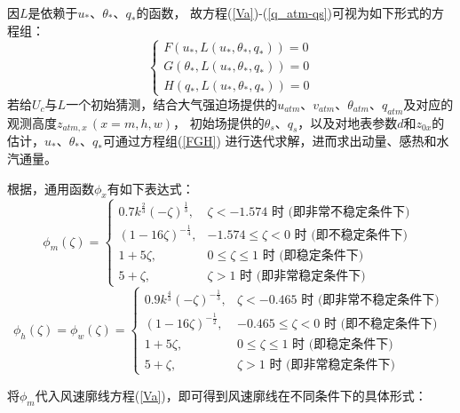 因$L$是依赖于$u_\ast$、$\theta_\ast$、$q_\ast$的函数，
故方程(\ref{Va})-(\ref{q_atm-qs})可视为如下形式的方程组：
\begin{equation}\label{FGH}
\left\{\begin{array}{l}F\left(u_{*}, L\left(u_{*}, \theta_{*}, q_{*}\right)\right)=0 \\
      G\left(\theta_{*}, L\left(u_{*}, \theta_{*}, q_{*}\right)\right)=0 \\ 
      H\left(q_{*}, L\left(u_{*}, \theta_{*}, q_{*}\right)\right)=0\end{array}\right.
\end{equation}
若给$U_c$与$L$一个初始猜测，结合大气强迫场提供的$u_{atm}$、$v_{atm}$、$\theta_{atm}$、$q_{atm}$及对应的观测高度$z_{atm,x}\, (x=m,h,w)$，
初始场提供的$\theta_s$、$q_s$，以及对地表参数$d$和$z_{0x}$的估计，$u_\ast$、$\theta_\ast$、$q_\ast$可通过方程组(\ref{FGH})
进行迭代求解，进而求出动量、感热和水汽通量。

根据\citet{zeng1998intercomparison}，通用函数$\phi_x$有如下表达式：
\begin{equation}\label{phim_zeng}
   \phi_{m}(\zeta)=\begin{cases}
     0.7 k^{\frac{2}{3}}(-\zeta)^{\frac{1}{3}}, & \zeta<-1.574 \text { 时 (即非常不稳定条件下) } \\
     (1-16 \zeta)^{-\frac{1}{4}}, & -1.574 \leq \zeta<0 \text { 时 (即不稳定条件下) } \\
     1+5 \zeta, & 0 \leq \zeta \leq 1 \text { 时 (即稳定条件下) } \\ 
     5+\zeta, & \zeta>1 \text { 时 (即非常稳定条件下) }
   \end{cases}
\end{equation}
\begin{equation}
  \phi_{h}(\zeta)=\phi_{w}(\zeta)=\begin{cases}
     0.9 k^{\frac{4}{3}}(-\zeta)^{-\frac{1}{3}}, & \zeta<-0.465 \text { 时 (即非常不稳定条件下) } \\ 
     (1-16 \zeta)^{-\frac{1}{2}}, & -0.465 \leq \zeta<0 \text { 时 (即不稳定条件下) } \\ 
     1+5 \zeta, & 0 \leq \zeta \leq 1 \text { 时 (即稳定条件下) } \\
     5+\zeta, & \zeta>1 \text { 时 (即非常稳定条件下) }
   \end{cases}
\end{equation}

将$\phi_m$代入风速廓线方程(\ref{Va})，即可得到风速廓线在不同条件下的具体形式：

